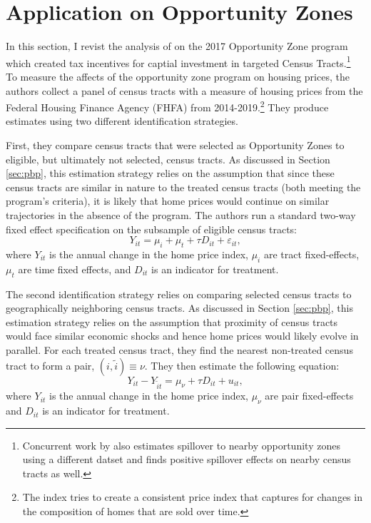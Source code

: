 \documentclass[11pt]{article}
\begin{document}
\section{Application on Opportunity Zones}\label{sec:oz}

In this section, I revist the analysis of \citet{Chen_Glaeser_Wessel_2021} on the 2017 Opportunity Zone program which created tax incentives for captial investment in targeted Census Tracts.\footnote{Concurrent work by \citet{Arefeva_2021} also estimates spillover to nearby opportunity zones using a different datset and finds positive spillover effects on nearby census tracts as well.} To measure the affects of the opportunity zone program on housing prices, the authors collect a panel of census tracts with a measure of housing prices from the Federal Housing Finance Agency (FHFA) from 2014-2019.\footnote{The index tries to create a consistent price index that captures for changes in the composition of homes that are sold over time.} They produce estimates using two different identification strategies.

First, they compare census tracts that were selected as Opportunity Zones to eligible, but ultimately not selected, census tracts. As discussed in Section \ref{sec:pbp}, this estimation strategy relies on the assumption that since these census tracts are similar in nature to the treated census tracts (both meeting the program's criteria), it is likely that home prices would continue on similar trajectories in the absence of the program. The authors run a standard two-way fixed effect specification on the subsample of eligible census tracts:
\begin{equation}\label{eq:oz-eligible}
    Y_{it} = \mu_i + \mu_t + \tau D_{it} + \varepsilon_{it},
\end{equation}
where $Y_{it}$ is the annual change in the home price index, $\mu_i$ are tract fixed-effects, $\mu_t$ are time fixed effects, and $D_{it}$ is an indicator for treatment. 

The second identification strategy relies on comparing selected census tracts to geographically neighboring census tracts. As discussed in Section \ref{sec:pbp}, this estimation strategy relies on the assumption that proximity of census tracts would face similar economic shocks and hence home prices would likely evolve in parallel. For each treated census tract, they find the nearest non-treated census tract to form a pair, $(i, \tilde{i}) \equiv \nu$. They then estimate the following equation:
\begin{equation}\label{eq:oz-neighbor}
    Y_{it} - Y_{\tilde{i}t}  = \mu_\nu + \tau D_{it} + u_{it},
\end{equation}
where $Y_{it}$ is the annual change in the home price index, $\mu_\nu$ are pair fixed-effects and $D_{it}$ is an indicator for treatment. 
\end{document}
